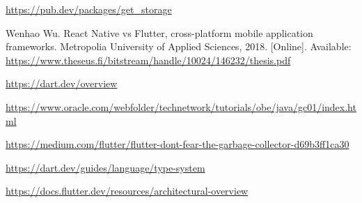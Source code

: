  \url {https://pub.dev/packages/get_storage}

 Wenhao Wu. React Native vs Flutter, cross-platform mobile application frameworks. Metropolia University of Applied Sciences, 2018. [Online]. Available: \url{https://www.theseus.fi/bitstream/handle/10024/146232/thesis.pdf}

 \url{https://dart.dev/overview}

 \url{https://www.oracle.com/webfolder/technetwork/tutorials/obe/java/gc01/index.html}

 \url{https://medium.com/flutter/flutter-dont-fear-the-garbage-collector-d69b3ff1ca30}

 \url{https://dart.dev/guides/language/type-system}

 \url{https://docs.flutter.dev/resources/architectural-overview}

